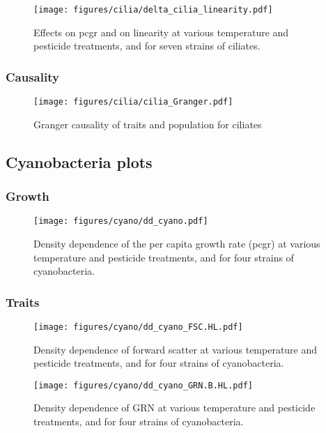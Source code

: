 \begin{figure}[hbt!]
    \centering
    \texttt{[image: figures/cilia/delta\_cilia\_linearity.pdf]}
    \caption{Effects on pcgr and on linearity at various temperature and pesticide treatments, and for seven strains of ciliates.}
    \label{fig:delta_cilia_linearity}
\end{figure}

\subsubsection{Causality}

\begin{figure}[hbt!]
    \centering
    \texttt{[image: figures/cilia/cilia\_Granger.pdf]}
    \caption{Granger causality of traits and population for ciliates}
    \label{fig:cilia_granger}
\end{figure}


\clearpage

\subsection{Cyanobacteria plots}

\subsubsection{Growth}

\begin{figure}[hbt!]
    \centering
    \texttt{[image: figures/cyano/dd\_cyano.pdf]}
    \caption{Density dependence of the per capita growth rate (pcgr) at various temperature and pesticide treatments, and for four strains of cyanobacteria.}
    \label{fig:dd_cyano}
\end{figure}

\clearpage

\subsubsection{Traits}

\begin{figure}[hbt!]
    \centering
    \texttt{[image: figures/cyano/dd\_cyano\_FSC.HL.pdf]}
    \caption{Density dependence of forward scatter at various temperature and pesticide treatments, and for four strains of cyanobacteria.}
    \label{fig:dd_cyano_FSC.HL}
\end{figure}

\begin{figure}[hbt!]
    \centering
    \texttt{[image: figures/cyano/dd\_cyano\_GRN.B.HL.pdf]}
    \caption{Density dependence of GRN at various temperature and pesticide treatments, and for four strains of cyanobacteria.}
    \label{fig:dd_cyano_GRN.B.HL}
\end{figure}

